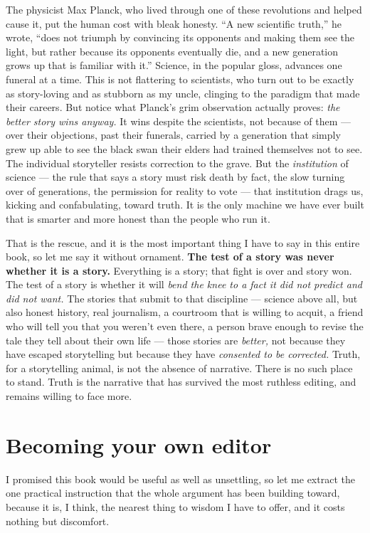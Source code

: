 The physicist Max Planck, who lived through one of these revolutions and helped cause it, put the human cost with bleak honesty. ``A new scientific truth,'' he wrote, ``does not triumph by convincing its opponents and making them see the light, but rather because its opponents eventually die, and a new generation grows up that is familiar with it.'' Science, in the popular gloss, advances one funeral at a time. This is not flattering to scientists, who turn out to be exactly as story-loving and as stubborn as my uncle, clinging to the paradigm that made their careers. But notice what Planck's grim observation actually proves: \emph{the better story wins anyway.} It wins despite the scientists, not because of them — over their objections, past their funerals, carried by a generation that simply grew up able to see the black swan their elders had trained themselves not to see. The individual storyteller resists correction to the grave. But the \emph{institution} of science — the rule that says a story must risk death by fact, the slow turning over of generations, the permission for reality to vote — that institution drags us, kicking and confabulating, toward truth. It is the only machine we have ever built that is smarter and more honest than the people who run it.

That is the rescue, and it is the most important thing I have to say in this entire book, so let me say it without ornament. \textbf{The test of a story was never whether it is a story.} Everything is a story; that fight is over and story won. The test of a story is whether it will \emph{bend the knee to a fact it did not predict and did not want.} The stories that submit to that discipline — science above all, but also honest history, real journalism, a courtroom that is willing to acquit, a friend who will tell you that you weren't even there, a person brave enough to revise the tale they tell about their own life — those stories are \emph{better,} not because they have escaped storytelling but because they have \emph{consented to be corrected.} Truth, for a storytelling animal, is not the absence of narrative. There is no such place to stand. Truth is the narrative that has survived the most ruthless editing, and remains willing to face more.

\section*{Becoming your own editor}

I promised this book would be useful as well as unsettling, so let me extract the one practical instruction that the whole argument has been building toward, because it is, I think, the nearest thing to wisdom I have to offer, and it costs nothing but discomfort.


